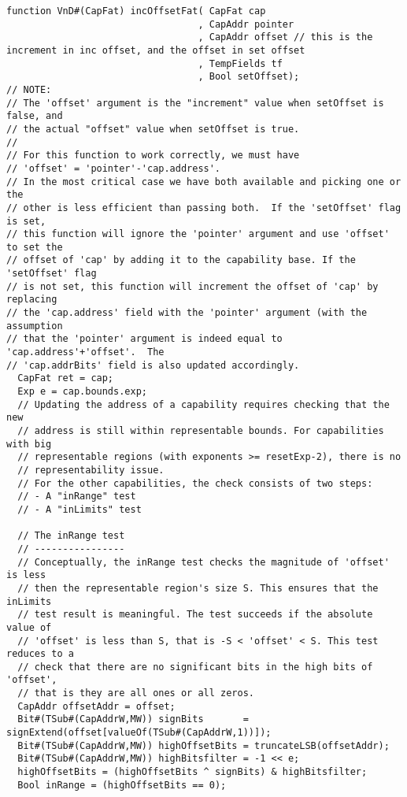 \begin{lstlisting}[language=bluespec]
function VnD#(CapFat) incOffsetFat( CapFat cap
                                  , CapAddr pointer
                                  , CapAddr offset // this is the increment in inc offset, and the offset in set offset
                                  , TempFields tf
                                  , Bool setOffset);
// NOTE:
// The 'offset' argument is the "increment" value when setOffset is false, and
// the actual "offset" value when setOffset is true.
//
// For this function to work correctly, we must have
// 'offset' = 'pointer'-'cap.address'.
// In the most critical case we have both available and picking one or the
// other is less efficient than passing both.  If the 'setOffset' flag is set,
// this function will ignore the 'pointer' argument and use 'offset' to set the
// offset of 'cap' by adding it to the capability base. If the 'setOffset' flag
// is not set, this function will increment the offset of 'cap' by replacing
// the 'cap.address' field with the 'pointer' argument (with the assumption
// that the 'pointer' argument is indeed equal to 'cap.address'+'offset'.  The
// 'cap.addrBits' field is also updated accordingly.
  CapFat ret = cap;
  Exp e = cap.bounds.exp;
  // Updating the address of a capability requires checking that the new
  // address is still within representable bounds. For capabilities with big
  // representable regions (with exponents >= resetExp-2), there is no
  // representability issue.
  // For the other capabilities, the check consists of two steps:
  // - A "inRange" test
  // - A "inLimits" test

  // The inRange test
  // ----------------
  // Conceptually, the inRange test checks the magnitude of 'offset' is less
  // then the representable region's size S. This ensures that the inLimits
  // test result is meaningful. The test succeeds if the absolute value of
  // 'offset' is less than S, that is -S < 'offset' < S. This test reduces to a
  // check that there are no significant bits in the high bits of 'offset',
  // that is they are all ones or all zeros.
  CapAddr offsetAddr = offset;
  Bit#(TSub#(CapAddrW,MW)) signBits       = signExtend(offset[valueOf(TSub#(CapAddrW,1))]);
  Bit#(TSub#(CapAddrW,MW)) highOffsetBits = truncateLSB(offsetAddr);
  Bit#(TSub#(CapAddrW,MW)) highBitsfilter = -1 << e;
  highOffsetBits = (highOffsetBits ^ signBits) & highBitsfilter;
  Bool inRange = (highOffsetBits == 0);


\end{lstlisting}

